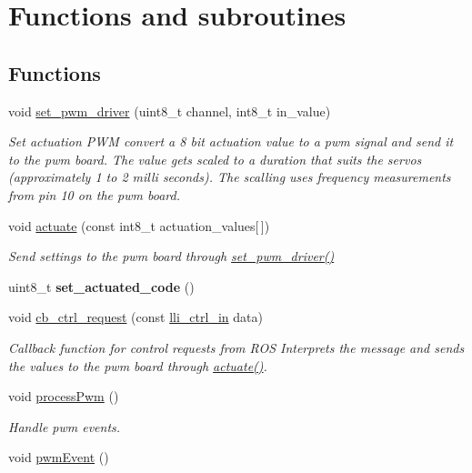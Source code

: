 \hypertarget{group__Functions}{}\section{Functions and subroutines}
\label{group__Functions}
\subsection*{Functions}
\begin{DoxyCompactItemize}
\item 
void \hyperlink{group__Functions_gadab070eb39b45b4c79b5d7e3cafa9514}{set\+\_\+pwm\+\_\+driver} (uint8\+\_\+t channel, int8\+\_\+t in\+\_\+value)
\begin{DoxyCompactList}\small\item\em Set actuation P\+WM convert a 8 bit actuation value to a pwm signal and send it to the pwm board. The value gets scaled to a duration that suits the servos (approximately 1 to 2 milli seconds). The scalling uses frequency measurements from pin 10 on the pwm board. \end{DoxyCompactList}\item 
void \hyperlink{group__Functions_gaa5545eb35f187e5fd11a483a265bed7b}{actuate} (const int8\+\_\+t actuation\+\_\+values\mbox{[}$\,$\mbox{]})
\begin{DoxyCompactList}\small\item\em Send settings to the pwm board through \hyperlink{group__Functions_gadab070eb39b45b4c79b5d7e3cafa9514}{set\+\_\+pwm\+\_\+driver()} \end{DoxyCompactList}\item 
uint8\+\_\+t {\bfseries set\+\_\+actuated\+\_\+code} ()\hypertarget{group__Functions_gad7d57085af575cbb5dc21e523f3a3321}{}\label{group__Functions_gad7d57085af575cbb5dc21e523f3a3321}

\item 
void \hyperlink{group__Functions_ga75bbdc12a150ad66dc004cb30bb5de4f}{cb\+\_\+ctrl\+\_\+request} (const \hyperlink{group__GlobalVariables_ga397644608f772ef60685f6a938f43ea1}{lli\+\_\+ctrl\+\_\+in} data)
\begin{DoxyCompactList}\small\item\em Callback function for control requests from R\+OS Interprets the message and sends the values to the pwm board through \hyperlink{group__Functions_gaa5545eb35f187e5fd11a483a265bed7b}{actuate()}. \end{DoxyCompactList}\item 
void \hyperlink{group__Functions_gaf99fa97e441e842b197dacc4a1a95a99}{process\+Pwm} ()
\begin{DoxyCompactList}\small\item\em Handle pwm events. \end{DoxyCompactList}\item 
void \hyperlink{group__Functions_ga2948125fe6592c36c5c0e641478e2db0}{pwm\+Event} ()\hypertarget{group__Functions_ga2948125fe6592c36c5c0e641478e2db0}{}\label{group__Functions_ga2948125fe6592c36c5c0e641478e2db0}


\end{DoxyCompactItemize}
